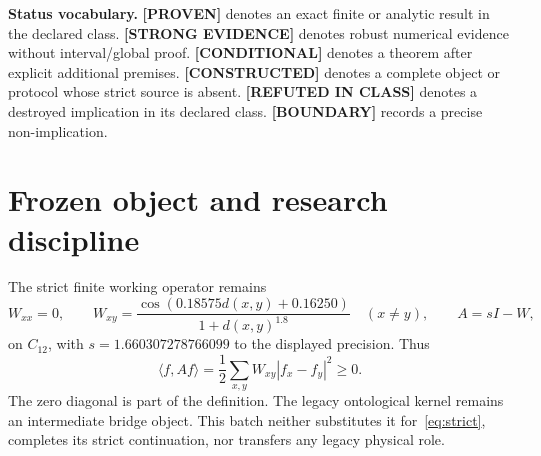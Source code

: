 \documentclass[11pt,a4paper]{article}
\newcommand{\proven}{\textcolor{green!40!black}{\textbf{[PROVEN]}}}
\newcommand{\strong}{\textcolor{blue!70!black}{\textbf{[STRONG EVIDENCE]}}}
\newcommand{\conditional}{\textcolor{black!60}{\textbf{[CONDITIONAL]}}}
\newcommand{\constructed}{\textcolor{violet!70!black}{\textbf{[CONSTRUCTED]}}}
\newcommand{\failed}{\textcolor{red!72!black}{\textbf{[REFUTED IN CLASS]}}}
\newcommand{\statusboundary}{\textcolor{orange!80!black}{\textbf{[BOUNDARY]}}}
\begin{document}
\begin{abstract}
ST77 numerically crosses the previously unresolved localized fold. It identifies a simple fold at
\[
\kappa_{\rm fold}=0.01658905238638291,
\qquad \operatorname{IPR}=0.9776497495,
\]
with augmented-system residual $8.33\times10^{-17}$ and then follows a return branch. This corrects ``termination'' to ``fold'' but is not interval-certified and does not reach strict coupling. ST78 proves that coupling the constructed ST66 order parameter to the strict first doublet quenches its twelve nonzero branches at
\[
g_c=\mu/\lambda_1=0.4641164063;
\]
unit coupling lies above this threshold. ST79 proves a reflection-stabilizer no-go for deterministic strict-sourced Bargmann chirality. ST80 exports a signed validator with synthetic Ed25519 fixtures. ST81 retains all nine strict physical-source groups. The mathematical architecture is sharper; no new physical-source closure follows.
\end{abstract}

\textbf{Status vocabulary.} \proven{} denotes an exact finite or analytic result in the declared class. \strong{} denotes robust numerical evidence without interval/global proof. \conditional{} denotes a theorem after explicit additional premises. \constructed{} denotes a complete object or protocol whose strict source is absent. \failed{} denotes a destroyed implication in its declared class. \statusboundary{} records a precise non-implication.

\tableofcontents
\newpage

\section{Frozen object and research discipline}

The strict finite working operator remains
\begin{equation}
W_{xx}=0,\qquad
W_{xy}=\frac{\cos(0.18575d(x,y)+0.16250)}{1+d(x,y)^{1.8}}\quad(x\ne y),
\qquad A=sI-W,
\label{eq:strict}
\end{equation}
on $C_{12}$, with $s=1.660307278766099$ to the displayed precision. Thus
\[
\langle f,Af\rangle=\frac12\sum_{x,y}W_{xy}|f_x-f_y|^2\ge0.
\]
The zero diagonal is part of the definition. The legacy ontological kernel remains an intermediate bridge object. This batch neither substitutes it for~\eqref{eq:strict}, completes its strict continuation, nor transfers any legacy physical role.
\end{document}
